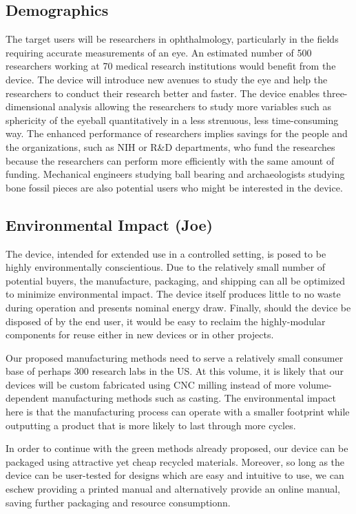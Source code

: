 \documentclass{article}
\begin{document}
\subsection{Demographics}
\label{sec:Demographics}

The target users will be researchers in ophthalmology,
particularly in the fields requiring accurate measurements of an
eye. An estimated number of 500 researchers working at 70 medical research institutions would
benefit from the device. The device will introduce new avenues to
study the eye and help the researchers to conduct their research
better and faster. The device enables three-dimensional analysis
allowing the researchers to study more variables such as sphericity of
the eyeball quantitatively in a less strenuous, less time-consuming
way. The enhanced performance of researchers implies savings for the
people and the organizations, such as NIH or R\&D departments, who
fund the researches because the researchers can perform more
efficiently with the same amount of funding. Mechanical engineers
studying ball bearing and archaeologists studying bone fossil pieces
are also potential users who might be interested in the device.
\subsection{Environmental Impact (Joe)}
\label{sec:environment}

The device, intended for extended use in a controlled setting, is
posed to be highly environmentally conscientious. Due to the
relatively small number of potential buyers, the manufacture,
packaging, and shipping can all be optimized to minimize environmental
impact. The device itself produces little to no waste during operation
and presents nominal energy draw. Finally, should the device be
disposed of by the end user, it would be easy to reclaim the
highly-modular components for reuse either in new devices or in other
projects.

Our proposed manufacturing methods need to serve a relatively small
consumer base of perhaps 300 research labs in the US. At this volume,
it is likely that our devices will be custom fabricated using CNC
milling instead of more volume-dependent manufacturing methods such as
casting. The environmental impact here is that the manufacturing
process can operate with a smaller footprint while outputting a
product that is more likely to last through more cycles.

In order to continue with the green methods already proposed, our
device can be packaged using attractive yet cheap recycled
materials. Moreover, so long as the device can be user-tested for
designs which are easy and intuitive to use, we can eschew providing a
printed manual and alternatively provide an online manual, saving
further packaging and resource consumptionn.
\end{document}
